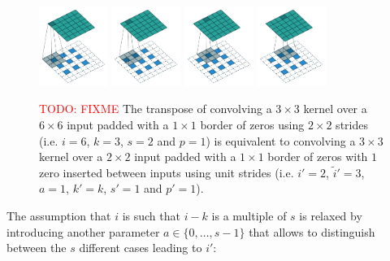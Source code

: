 \documentclass{article}
\newcommand{\todo}[1]{\textcolor{red}{TODO: #1}}
\begin{document}
\begin{figure}[h]
    \centering
    \includegraphics[width=0.2\textwidth]
        {pdf/padding_strides_odd_transposed_00.pdf}
    \includegraphics[width=0.2\textwidth]
        {pdf/padding_strides_odd_transposed_01.pdf}
    \includegraphics[width=0.2\textwidth]
        {pdf/padding_strides_odd_transposed_02.pdf}
    \includegraphics[width=0.2\textwidth]
        {pdf/padding_strides_odd_transposed_03.pdf}
    \caption{\label{fig:padding_strides_odd_transposed} \todo{FIXME} The
        transpose of convolving a $3 \times 3$ kernel over a $6 \times 6$ input
        padded with a $1 \times 1$ border of zeros using $2 \times 2$ strides
        (i.e. $i = 6$, $k = 3$, $s = 2$ and $p = 1$) is equivalent to convolving
        a $3 \times 3$ kernel over a $2 \times 2$ input padded with a $1 \times
        1$ border of zeros with $1$ zero inserted between inputs using unit
        strides (i.e. $i' = 2$, $\tilde{i}' = 3$, $a = 1$, $k' = k$, $s' = 1$
        and $p' = 1$).}
\end{figure}

The assumption that $i$ is such that $i - k$ is a multiple of $s$ is relaxed by
introducing another parameter $a \in \{0, \ldots, s - 1\}$ that allows to
distinguish between the $s$ different cases leading to $i'$:
\end{document}

